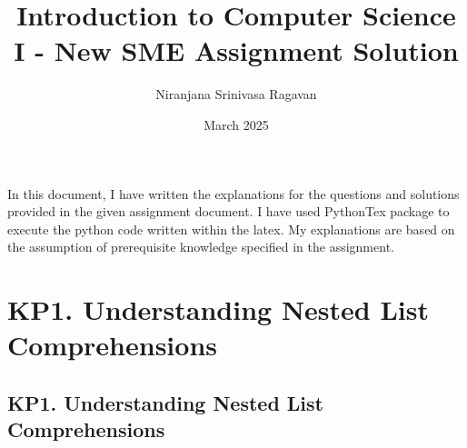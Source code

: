 \documentclass{article}
\title{Introduction to Computer Science I - New SME Assignment Solution}
\author{Niranjana Srinivasa Ragavan}
\date{March 2025}
\begin{document}
\maketitle

In this document, I have written the explanations for the questions and solutions provided in the given assignment document. I have used PythonTex package to execute the python code written within the latex.
My explanations are based on the assumption of prerequisite knowledge specified in the assignment.

\section*{KP1. Understanding Nested List Comprehensions}
\subsection*{KP1. Understanding Nested List Comprehensions}
\end{document}
